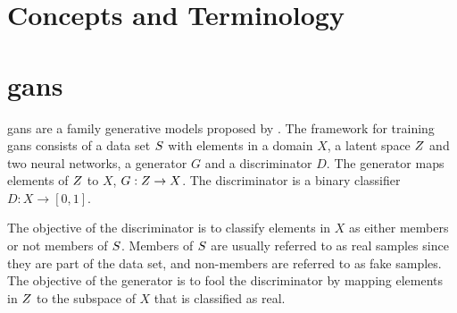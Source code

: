\section{Concepts and Terminology}


\section{\acrlong{gans}}
\acrfull{gans} are a family generative models proposed by \textcite{goodfellow2014generative}. The framework for training \acrshort{gans} consists of a data set $S$ with elements in a domain $X$, a latent space $Z$ and two neural networks, a generator $G$ and a discriminator $D$. The generator maps elements of $Z$ to $X$, $G: Z \rightarrow X$. The discriminator is a binary classifier $D: X \rightarrow [0, 1]$. 

The objective of the discriminator is to classify elements in $X$ as either members or not members of $S$. Members of $S$ are usually referred to as real samples since they are part of the data set, and non-members are referred to as fake samples. The objective of the generator is to fool the discriminator by mapping elements in $Z$ to the subspace of $X$ that is classified as real. 


